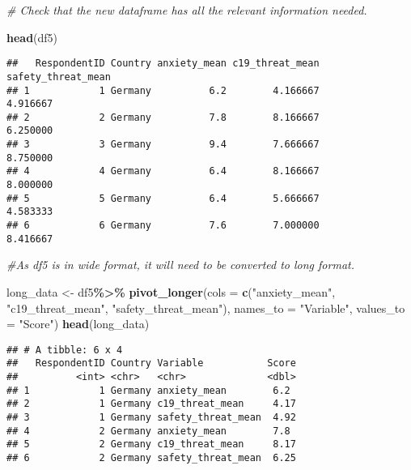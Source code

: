 \documentclass[
]{article}
\newenvironment{Shaded}{\begin{snugshade}}{\end{snugshade}}
\newcommand{\AttributeTok}[1]{\textcolor[rgb]{0.13,0.29,0.53}{#1}}
\newcommand{\CommentTok}[1]{\textcolor[rgb]{0.56,0.35,0.01}{\textit{#1}}}
\newcommand{\FunctionTok}[1]{\textcolor[rgb]{0.13,0.29,0.53}{\textbf{#1}}}
\newcommand{\NormalTok}[1]{#1}
\newcommand{\OtherTok}[1]{\textcolor[rgb]{0.56,0.35,0.01}{#1}}
\newcommand{\SpecialCharTok}[1]{\textcolor[rgb]{0.81,0.36,0.00}{\textbf{#1}}}
\newcommand{\StringTok}[1]{\textcolor[rgb]{0.31,0.60,0.02}{#1}}
\begin{document}
\begin{Shaded}
\begin{Highlighting}[]
\CommentTok{\# Check that the new dataframe has all the relevant information needed. }


\FunctionTok{head}\NormalTok{(df5)}
\end{Highlighting}
\end{Shaded}

\begin{verbatim}
##   RespondentID Country anxiety_mean c19_threat_mean safety_threat_mean
## 1            1 Germany          6.2        4.166667           4.916667
## 2            2 Germany          7.8        8.166667           6.250000
## 3            3 Germany          9.4        7.666667           8.750000
## 4            4 Germany          6.4        8.166667           8.000000
## 5            5 Germany          6.4        5.666667           4.583333
## 6            6 Germany          7.6        7.000000           8.416667
\end{verbatim}

\begin{Shaded}
\begin{Highlighting}[]
\CommentTok{\#As df5 is in wide format, it will need to be converted to long format. }

\NormalTok{long\_data }\OtherTok{\textless{}{-}}\NormalTok{ df5}\SpecialCharTok{\%\textgreater{}\%}
  \FunctionTok{pivot\_longer}\NormalTok{(}\AttributeTok{cols =} \FunctionTok{c}\NormalTok{(}\StringTok{"anxiety\_mean"}\NormalTok{, }\StringTok{"c19\_threat\_mean"}\NormalTok{, }\StringTok{"safety\_threat\_mean"}\NormalTok{), }
               \AttributeTok{names\_to =} \StringTok{"Variable"}\NormalTok{,}
               \AttributeTok{values\_to =} \StringTok{"Score"}\NormalTok{)}
\FunctionTok{head}\NormalTok{(long\_data)}
\end{Highlighting}
\end{Shaded}

\begin{verbatim}
## # A tibble: 6 x 4
##   RespondentID Country Variable           Score
##          <int> <chr>   <chr>              <dbl>
## 1            1 Germany anxiety_mean        6.2 
## 2            1 Germany c19_threat_mean     4.17
## 3            1 Germany safety_threat_mean  4.92
## 4            2 Germany anxiety_mean        7.8 
## 5            2 Germany c19_threat_mean     8.17
## 6            2 Germany safety_threat_mean  6.25
\end{verbatim}
\end{document}
